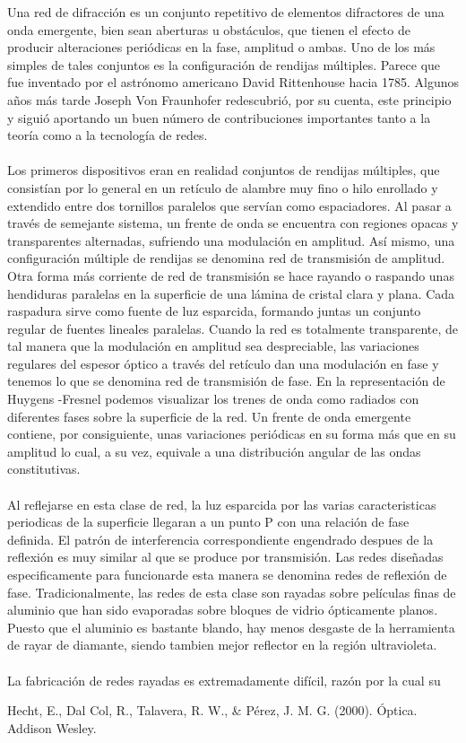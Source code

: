 \documentclass[12]{article}
\begin{document}
\begin{multicols}{2}
Una red de difracción es un conjunto repetitivo de elementos difractores de una onda emergente, bien sean aberturas u obstáculos, que tienen el efecto de producir alteraciones periódicas en la fase, amplitud o ambas. Uno de los más simples de tales conjuntos es la configuración de rendijas múltiples. Parece que fue inventado por el astrónomo americano David Rittenhouse hacia 1785. Algunos años más tarde Joseph Von Fraunhofer redescubrió, por su cuenta, este principio y siguió aportando un buen número de contribuciones importantes tanto a la teoría como a la tecnología de redes.\\ \\ 
Los primeros dispositivos eran en realidad conjuntos de rendijas múltiples, que consistían por lo general en un retículo de alambre muy fino o hilo enrollado y extendido entre dos tornillos paralelos que servían como espaciadores. Al pasar a través de semejante sistema, un frente de onda se encuentra con regiones opacas y transparentes alternadas, sufriendo una modulación en amplitud. Así mismo, una configuración múltiple de rendijas se denomina red de transmisión de amplitud. Otra forma más corriente de red de transmisión se hace rayando o raspando  unas hendiduras paralelas en la superficie de una lámina de cristal clara y plana. Cada raspadura sirve como fuente de luz esparcida, formando juntas un conjunto regular de fuentes lineales paralelas. Cuando la red es totalmente transparente, de tal manera que la modulación en amplitud sea despreciable, las variaciones regulares del espesor óptico a través del retículo dan una modulación en fase y tenemos lo que se denomina red de transmisión de fase. En la representación de Huygens -Fresnel podemos visualizar los trenes de onda como radiados con diferentes fases sobre la superficie de la red. Un frente de onda emergente contiene, por consiguiente, unas variaciones periódicas en su forma más que en su amplitud lo cual, a su vez, equivale a una distribución angular de las ondas constitutivas. \\ \\
Al reflejarse en esta clase de red, la luz esparcida por las varias caracteristicas periodicas de la superficie llegaran a un punto P con una relación de fase definida. El patrón de interferencia correspondiente engendrado despues de la reflexión es muy similar al que se produce por transmisión. Las redes diseñadas especificamente para funcionarde esta manera se denomina redes de reflexión de fase. Tradicionalmente, las redes de esta clase son rayadas sobre películas finas de aluminio que han sido evaporadas sobre bloques de vidrio ópticamente planos. Puesto que el aluminio es bastante blando, hay menos desgaste de la herramienta de rayar de diamante, siendo tambien mejor reflector en la región ultravioleta. \\ \\
La fabricación de redes rayadas es extremadamente difícil, razón por la cual su 

\begin{thebibliography}{99}

 Hecht, E., Dal Col, R., Talavera, R. W., \& Pérez, J. M. G. (2000). Óptica. Addison Wesley.
\end{thebibliography}
\end{multicols}
\end{document}
